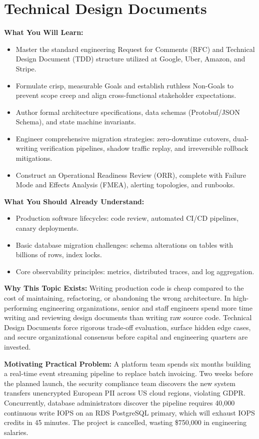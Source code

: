 \chapter{Technical Design Documents}
\label{ch:technical-design-docs}

\begin{chaptergoalsbox}
\textbf{What You Will Learn:}
\begin{itemize}[leftmargin=12pt]
  \item Master the standard engineering Request for Comments (RFC) and Technical Design Document (TDD) structure utilized at Google, Uber, Amazon, and Stripe.
  \item Formulate crisp, measurable Goals and establish ruthless Non-Goals to prevent scope creep and align cross-functional stakeholder expectations.
  \item Author formal architecture specifications, data schemas (Protobuf/JSON Schema), and state machine invariants.
  \item Engineer comprehensive migration strategies: zero-downtime cutovers, dual-writing verification pipelines, shadow traffic replay, and irreversible rollback mitigations.
  \item Construct an Operational Readiness Review (ORR), complete with Failure Mode and Effects Analysis (FMEA), alerting topologies, and runbooks.
\end{itemize}

\textbf{What You Should Already Understand:}
\begin{itemize}[leftmargin=12pt]
  \item Production software lifecycles: code review, automated CI/CD pipelines, canary deployments.
  \item Basic database migration challenges: schema alterations on tables with billions of rows, index locks.
  \item Core observability principles: metrics, distributed traces, and log aggregation.
\end{itemize}

\textbf{Why This Topic Exists:}
Writing production code is cheap compared to the cost of maintaining, refactoring, or abandoning the wrong architecture. In high-performing engineering organizations, senior and staff engineers spend more time writing and reviewing design documents than writing raw source code. Technical Design Documents force rigorous trade-off evaluation, surface hidden edge cases, and secure organizational consensus before capital and engineering quarters are invested.

\textbf{Motivating Practical Problem:}
A platform team spends six months building a real-time event streaming pipeline to replace batch invoicing. Two weeks before the planned launch, the security compliance team discovers the new system transfers unencrypted European PII across US cloud regions, violating GDPR. Concurrently, database administrators discover the pipeline requires 40,000 continuous write IOPS on an RDS PostgreSQL primary, which will exhaust IOPS credits in 45 minutes. The project is cancelled, wasting \$750,000 in engineering salaries.
\end{chaptergoalsbox}

